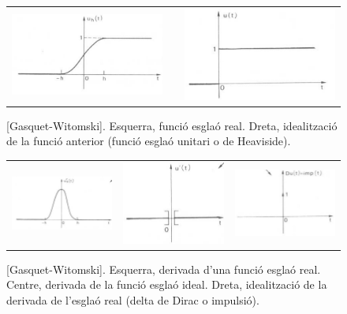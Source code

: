 \documentclass{article}
\begin{document}
\begin{figure}[htbp]
\begin{tabular}{rcl}
\includegraphics[width=6cm]{imatges/esglaoreal.eps} & &
\includegraphics[width=6cm]{imatges/esglaoideal.eps}
\end{tabular}
\caption{[Gasquet-Witomski]. Esquerra, funci\'o esgla\'o real. 
Dreta, idealitzaci\'o de la funci\'o anterior (funci\'o esgla\'o unitari o
de Heaviside).}
\label{esglao.fig}
\end{figure}

\begin{figure}[htbp]
\begin{tabular}{lcr}
\includegraphics[width=4cm]{imatges/deltareal.eps} & 
\includegraphics[width=4cm]{imatges/deltamatematic.eps} & 
\includegraphics[width=4cm]{imatges/deltaideal.eps}
\end{tabular}
\caption{[Gasquet-Witomski]. Esquerra, derivada d'una funci\'o esgla\'o real. 
Centre, derivada de la funci\'o esgla\'o ideal.
Dreta, idealitzaci\'o de la derivada de l'esgla\'o real
(delta de Dirac o impulsi\'o).}
\label{delta.fig}
\end{figure}
\end{document}
